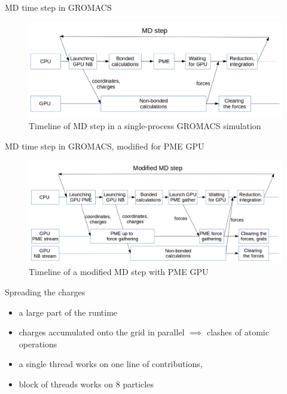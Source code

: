 \documentclass[11pt]{beamer}
\begin{document}
\begin{frame}{MD time step in GROMACS}
\begin{figure}
    \centering
    \includegraphics[width=1\textwidth]{pics/mdstep-orig.png}
    \caption{Timeline of MD step in a single-process GROMACS simulation}
    \label{fig:step-orig}
\end{figure}
\FloatBarrier
\end{frame}

\begin{frame}{MD time step in GROMACS, modified for PME GPU}
\begin{figure}
    \centering
    \includegraphics[width=1\textwidth]{pics/mdstep-gpu.png}
    \caption{Timeline of a modified MD step with PME GPU}
\end{figure}
\FloatBarrier
\end{frame}


\begin{frame}{Spreading the charges}
\begin{itemize}
\item a large part of the runtime
\item charges accumulated onto the grid in parallel $\implies$ clashes of atomic operations
\item a single thread works on one line of contributions, 
\item block of threads works on 8 particles
\end{itemize}
\end{frame}
\end{document}
